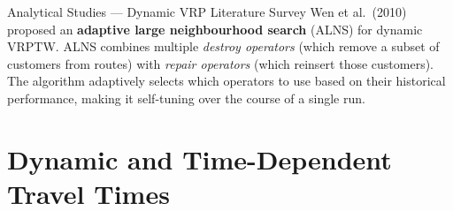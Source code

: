 \documentclass[aspectratio=169,10pt]{beamer}
\begin{document}
\begin{frame}[allowframebreaks]{Analytical Studies — Dynamic VRP Literature Survey}
  Wen et al.~(2010) proposed an \textbf{adaptive large neighbourhood search}
  (ALNS) for dynamic VRPTW.  ALNS combines multiple \emph{destroy operators}
  (which remove a subset of customers from routes) with \emph{repair operators}
  (which reinsert those customers).  The algorithm adaptively selects which
  operators to use based on their historical performance, making it
  self-tuning over the course of a single run.

\end{frame}

\section{Dynamic and Time-Dependent Travel Times}
\end{document}
